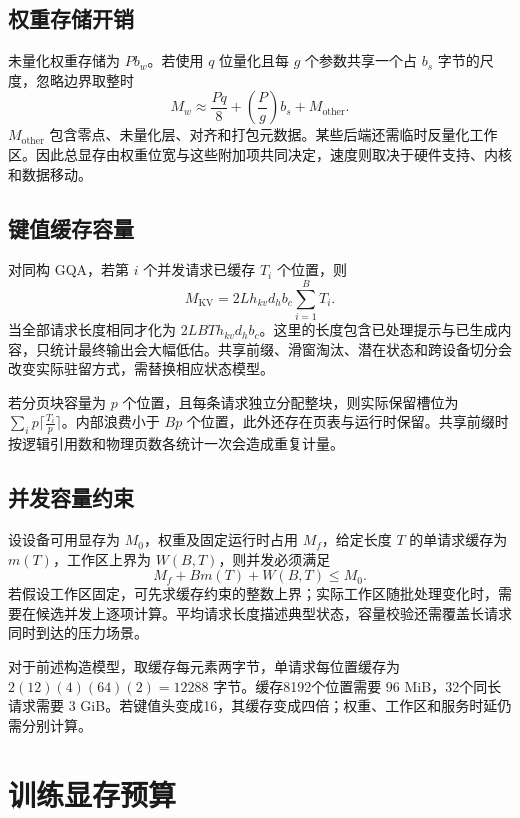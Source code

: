 \documentclass[../textbook.tex]{subfiles}
\begin{document}
\subsection{权重存储开销}
未量化权重存储为 $Pb_w$。若使用 $q$ 位量化且每 $g$ 个参数共享一个占 $b_s$ 字节的尺度，忽略边界取整时
\begin{equation}
 M_w\approx \frac{Pq}{8}+(\frac{P}{g})b_s+M_{\mathrm{other}}.
\end{equation}
$M_{\mathrm{other}}$ 包含零点、未量化层、对齐和打包元数据。某些后端还需临时反量化工作区。因此总显存由权重位宽与这些附加项共同决定，速度则取决于硬件支持、内核和数据移动。

\subsection{键值缓存容量}
对同构 GQA，若第 $i$ 个并发请求已缓存 $T_i$ 个位置，则
\begin{equation}\label{eq:budget-kv}
 M_{\mathrm{KV}}=2Lh_{kv}d_hb_c\sum_{i=1}^{B}T_i.
\end{equation}
当全部请求长度相同才化为 $2LBTh_{kv}d_hb_c$。这里的长度包含已处理提示与已生成内容，只统计最终输出会大幅低估。共享前缀、滑窗淘汰、潜在状态和跨设备切分会改变实际驻留方式，需替换相应状态模型。

若分页块容量为 $p$ 个位置，且每条请求独立分配整块，则实际保留槽位为 $\sum_i p\lceil \frac{T_i}{p}\rceil$。内部浪费小于 $Bp$ 个位置，此外还存在页表与运行时保留。共享前缀时按逻辑引用数和物理页数各统计一次会造成重复计量。

\subsection{并发容量约束}
设设备可用显存为 $M_0$，权重及固定运行时占用 $M_f$，给定长度 $T$ 的单请求缓存为 $m(T)$，工作区上界为 $W(B,T)$，则并发必须满足
\begin{equation}
 M_f+B m(T)+W(B,T)\le M_0.
\end{equation}
若假设工作区固定，可先求缓存约束的整数上界；实际工作区随批处理变化时，需要在候选并发上逐项计算。平均请求长度描述典型状态，容量校验还需覆盖长请求同时到达的压力场景。

对于前述构造模型，取缓存每元素两字节，单请求每位置缓存为 $2(12)(4)(64)(2)=12288$ 字节。缓存8192个位置需要 $96$ MiB，32个同长请求需要 $3$ GiB。若键值头变成16，其缓存变成四倍；权重、工作区和服务时延仍需分别计算。

\section{训练显存预算}
\end{document}
